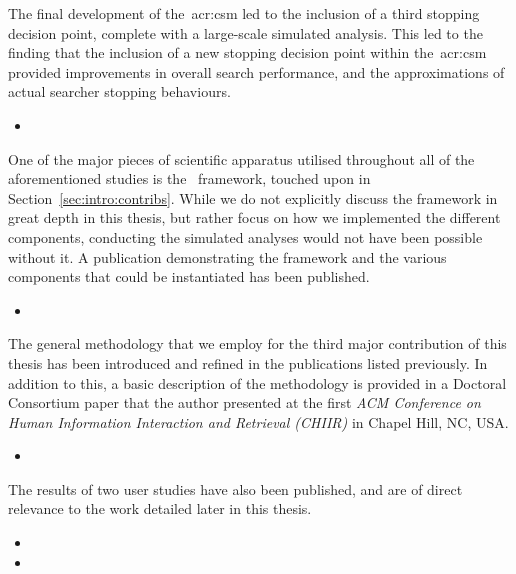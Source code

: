 The final development of the~\gls{acr:csm} led to the inclusion of a third stopping decision point, complete with a large-scale simulated analysis. This led to the finding that the inclusion of a new stopping decision point within the~\gls{acr:csm} provided improvements in overall search performance, and the approximations of actual searcher stopping behaviours.

\begin{itemize}
    \item{}
\end{itemize}

\noindent
{}
One of the major pieces of scientific apparatus utilised throughout all of the aforementioned studies is the \simiir~framework, touched upon in Section~\ref{sec:intro:contribs}. While we do not explicitly discuss the framework in great depth in this thesis, but rather focus on how we implemented the different components, conducting the simulated analyses would not have been possible without it. A publication demonstrating the framework and the various components that could be instantiated has been published.

\begin{itemize}
    \item{}
\end{itemize}

\noindent
{}
The general methodology that we employ for the third major contribution of this thesis has been introduced and refined in the publications listed previously. In addition to this, a basic description of the methodology is provided in a Doctoral Consortium paper that the author presented at the first \emph{ACM Conference on Human Information Interaction and Retrieval (CHIIR)} in Chapel Hill, NC, USA.

\begin{itemize}
    \item{}
\end{itemize}

The results of two user studies have also been published, and are of direct relevance to the work detailed later in this thesis.

\begin{itemize}
    \item{}
    \item{}
\end{itemize}

